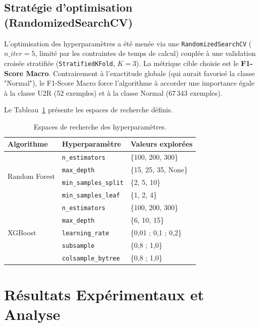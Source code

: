 \documentclass[12pt,a4paper]{report}
\begin{document}
\section{Stratégie d'optimisation (RandomizedSearchCV)}

L'optimisation des hyperparamètres a été menée via une \texttt{RandomizedSearchCV} ($n\_iter = 5$, limité par les contraintes de temps de calcul) couplée à une validation croisée stratifiée (\texttt{StratifiedKFold}, $K=3$). La métrique cible choisie est le \textbf{F1-Score Macro}. Contrairement à l'exactitude globale (qui aurait favorisé la classe "Normal"), le F1-Score Macro force l'algorithme à accorder une importance égale à la classe U2R (52 exemples) et à la classe Normal (67\,343 exemples).

Le Tableau~\ref{tab:hyperparams} présente les espaces de recherche définis.

\begin{table}[H]
    \centering
    \begin{tabular}{lll}
        \toprule
        \textbf{Algorithme} & \textbf{Hyperparamètre} & \textbf{Valeurs explorées} \\
        \midrule
        \multirow{4}{*}{Random Forest} & \texttt{n\_estimators} & \{100, 200, 300\} \\
         & \texttt{max\_depth} & \{15, 25, 35, None\} \\
         & \texttt{min\_samples\_split} & \{2, 5, 10\} \\
         & \texttt{min\_samples\_leaf} & \{1, 2, 4\} \\
        \midrule
        \multirow{5}{*}{XGBoost} & \texttt{n\_estimators} & \{100, 200, 300\} \\
         & \texttt{max\_depth} & \{6, 10, 15\} \\
         & \texttt{learning\_rate} & \{0,01 ; 0,1 ; 0,2\} \\
         & \texttt{subsample} & \{0,8 ; 1,0\} \\
         & \texttt{colsample\_bytree} & \{0,8 ; 1,0\} \\
        \bottomrule
    \end{tabular}
    \caption{Espaces de recherche des hyperparamètres.}
    \label{tab:hyperparams}
\end{table}


\chapter{Résultats Expérimentaux et Analyse}
\end{document}

